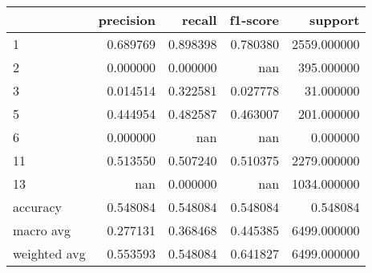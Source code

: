 \begin{tabular}{lrrrr}
\toprule
 & precision & recall & f1-score & support \\
\midrule
1 & 0.689769 & 0.898398 & 0.780380 & 2559.000000 \\
2 & 0.000000 & 0.000000 & nan & 395.000000 \\
3 & 0.014514 & 0.322581 & 0.027778 & 31.000000 \\
5 & 0.444954 & 0.482587 & 0.463007 & 201.000000 \\
6 & 0.000000 & nan & nan & 0.000000 \\
11 & 0.513550 & 0.507240 & 0.510375 & 2279.000000 \\
13 & nan & 0.000000 & nan & 1034.000000 \\
accuracy & 0.548084 & 0.548084 & 0.548084 & 0.548084 \\
macro avg & 0.277131 & 0.368468 & 0.445385 & 6499.000000 \\
weighted avg & 0.553593 & 0.548084 & 0.641827 & 6499.000000 \\
\bottomrule
\end{tabular}
